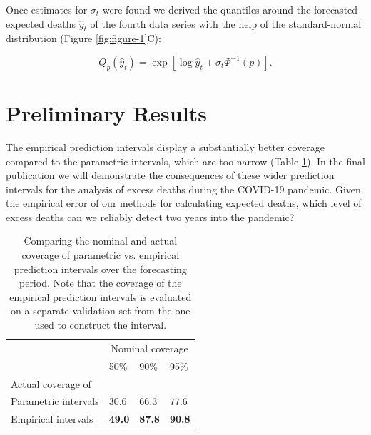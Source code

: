 \documentclass[12pt]{article}
\begin{document}
Once estimates for $\sigma_t$ were found we derived the quantiles around the forecasted expected deaths $\hat y_t$ of the fourth data series with the help of the standard-normal distribution (Figure \ref{fig:figure-1}C):

\begin{equation*}
  Q_p(\hat y_t) = \exp[\log \hat y_t + \sigma_t\Phi^{-1}(p)].
\end{equation*}

\clearpage

\section*{Preliminary Results}

The empirical prediction intervals display a substantially better coverage compared to the parametric intervals, which are too narrow (Table \ref{tab:coverage}). In the final publication we will demonstrate the consequences of these wider prediction intervals for the analysis of excess deaths during the COVID-19 pandemic. Given the empirical error of our methods for calculating expected deaths, which level of excess deaths can we reliably detect two years into the pandemic?

\begin{table}[ht]
  \centering
  \begin{tabular}{
  llll
  }
  \toprule
  & \multicolumn{3}{c}{Nominal coverage} \\
  & 50\% & 90\% & 95\% \\
   \midrule
Actual coverage of & & & \\
Parametric intervals  & 30.6 & 66.3 & 77.6 \\
Empirical  intervals & \bfseries49.0 & \bfseries87.8 & \bfseries90.8 \\
   \bottomrule
\end{tabular}
\caption{Comparing the nominal and actual coverage of parametric vs. empirical prediction intervals over the forecasting period. Note that the coverage of the empirical prediction intervals is evaluated on a separate validation set from the one used to construct the interval.}
\label{tab:coverage}
\end{table}


\clearpage




\clearpage
\end{document}
